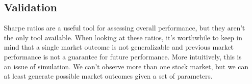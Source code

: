 \documentclass[a4paper]{article}\usepackage[]{graphicx}\usepackage[]{color}
\begin{document}
\begin{table}[ht]
\centering
{}
\caption{Expected returns, standard deviations and Sharpe ratios for the candidate assets for the various portfolios over the test period. The data used for estimating these statistics cover 01-09-2012 to 12-30-2013.} 
\label{tab:test}
\end{table}


\subsection{Validation}

Sharpe ratios are a useful tool for assessing overall performance, but they aren't the only tool available. When looking at these ratios, it's worthwhile to keep in mind that a single market outcome is not generalizable and previous market performance is not a guarantee for future performance. More intuitively, this is an issue of simulation. We can't observe more than one stock market, but we can at least generate possible market outcomes given a set of parameters.
\end{document}

